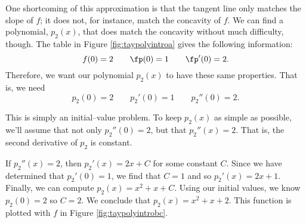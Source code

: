 One shortcoming of this approximation is that the tangent line only matches the slope of $f$; it does not, for instance, match the concavity of $f$. We can find a polynomial, $p_2(x)$, that does match the concavity without much difficulty, though. The table in Figure \ref{fig:taypolyintroa} gives the following information:
$$f(0) = 2 \qquad \fp(0) = 1\qquad \fp'(0) = 2.$$
Therefore, we want our polynomial $p_2(x)$ to have these same properties. That is, we need $$p_2(0) = 2 \qquad p_2'(0) = 1 \qquad p_2''(0) = 2.$$

This is simply an initial--value problem.  To keep $p_2(x)$ as simple as possible, we'll assume that not only  $p_2''(0)=2$, but that $p_2''(x)=2$. That is, the second derivative of $p_2$ is  constant.

If $p_2''(x) = 2$, then $p_2'(x) = 2x+C$ for some constant $C$. Since we have determined that $p_2'(0) = 1$, we find that $C=1$ and so $p_2'(x) = 2x+1$. Finally, we can compute $p_2(x) = x^2+x+C$. Using our initial values, we know $p_2(0) = 2$ so $C=2.$ We conclude that $p_2(x) = x^2+x+2.$ This function is plotted with $f$ in Figure \ref{fig:taypolyintrobc}.



